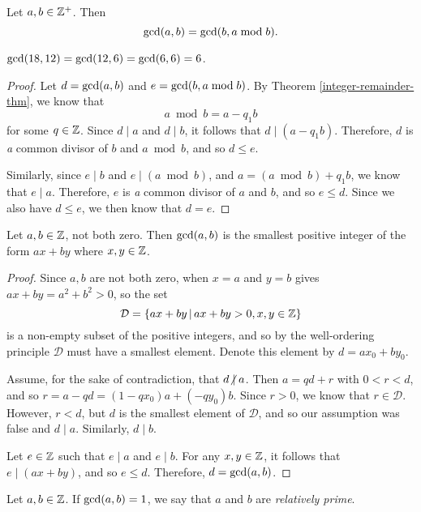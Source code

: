 \begin{prop}\label{euclidean-division-property}
    Let $a, b \in \mathbb{Z}^+$. Then \[\operatorname{gcd}(a, b) = \operatorname{gcd}(b, a \bmod b).\]
\end{prop}

\begin{exmp}
    $\operatorname{gcd}(18, 12) = \operatorname{gcd}(12, 6) = \operatorname{gcd}(6, 6) = 6$.
\end{exmp}

\begin{proof}
    Let $d = \operatorname{gcd}(a, b)$ and $e = \operatorname{gcd}(b, a \bmod b)$. By Theorem \ref{integer-remainder-thm}, we know that \[a \bmod b = a - q_1b\] for some $q \in \mathbb{Z}$. Since $d \mid a$ and $d \mid b$, it follows that $d \mid (a - q_1b)$. Therefore, $d$ is \emph{a} common divisor of $b$ and $a \bmod b$, and so $d \leq e$.

    Similarly, since $e \mid b$ and $e \mid (a \bmod b)$, and $a = (a \bmod b) + q_1b$, we know that $e \mid a$. Therefore, $e$ is \emph{a} common divisor of $a$ and $b$, and so $e \leq d$. Since we also have $d \leq e$, we then know that $d = e$.
\end{proof}

\begin{thm}\label{gcd-characterization}
    Let $a, b \in \mathbb{Z}$, not both zero. Then $\operatorname{gcd}(a, b)$ is the smallest positive integer of the form $ax + by$ where $x, y \in \mathbb{Z}$.
\end{thm}

\begin{proof}
    Since $a, b$ are not both zero, when $x = a$ and $y = b$ gives $ax + by = a^2 + b^2 > 0$, so the set \[\mathcal{D} = \left\{ax+by \,\middle|\, ax + by > 0, x, y \in \mathbb{Z} \right\}\] is a non-empty subset of the positive integers, and so by the well-ordering principle $\mathcal{D}$ must have a smallest element. Denote this element by $d = ax_0 + by_0$.

    Assume, for the sake of contradiction, that $d \centernot\mid a$. Then $a = qd + r$ with $0 < r < d$, and so $r = a - qd = (1-qx_0)a + (-qy_0)b$. Since $r > 0$, we know that $r \in \mathcal{D}$. However, $r < d$, but $d$ is the smallest element of $\mathcal{D}$, and so our assumption was false and $d \mid a$. Similarly, $d \mid b$.

    Let $e \in \mathbb{Z}$ such that $e \mid a$ and $e \mid b$. For any $x, y \in \mathbb{Z}$, it follows that $e \mid (ax + by)$, and so $e \leq d$. Therefore, $d = \operatorname{gcd}(a, b)$.
\end{proof}

\begin{defn}
    Let $a, b \in \mathbb{Z}$. If $\operatorname{gcd}(a, b) = 1$, we say that $a$ and $b$ are \emph{relatively prime}.
\end{defn}

